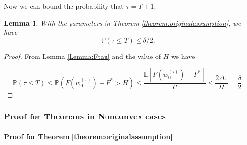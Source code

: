 \documentclass{article} %
\theoremstyle{plain}
\newtheorem{Lemma}[theorem]{Lemma}
\theoremstyle{definition}
\theoremstyle{remark}
\begin{document}
Now we can bound the probability that $\tau=T+1$.

\begin{Lemma}
\label{Lemma:poftau}
    With the parameters in Theorem \ref{theorem:originalassumption}, we have
    $$\mathbb{P}(\tau\leq T)\leq \delta/2.$$
\end{Lemma}

\begin{proof}

    From Lemma \ref{Lemma:Ftau} and the value of $H$ we have

    $$\mathbb{P}(\tau\leq T)\leq \mathbb{P}(F(w^{(\tau)}_0)-F^*>H)\leq \frac{\mathbb{E}[F(w^{(\tau)}_0)-F^*]}{H}\leq\frac{2\Delta_1}{H}=\frac{\delta}{2}.$$
\end{proof}

\subsubsection{Proof for Theorems in Nonconvex cases}
\label{appendix:proofsfornonconvex}

\paragraph{Proof for Theorem \ref{theorem:originalassumption}}
\end{document}
